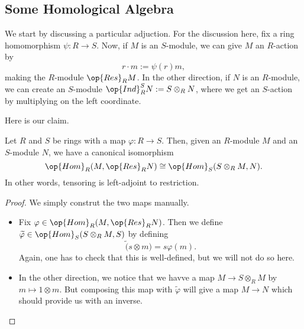 \subsection{Some Homological Algebra}
We start by discussing a particular adjuction. For the discussion here, fix a ring homomorphism $\psi:R\to S$. Now, if $M$ is an $S$-module, we can give $M$ an $R$-action by
\[r\cdot m:=\psi(r)m,\]
making the $R$-module $\op{Res}_RM$. In the other direction, if $N$ is an $R$-module, we can create an $S$-module $\op{Ind}_R^SN:=S\otimes_RN$, where we get an $S$-action by multiplying on the left coordinate.

Here is our claim.
\begin{proposition}
	Let $R$ and $S$ be rings with a map $\varphi:R\to S$. Then, given an $R$-module $M$ and an $S$-module $N$, we have a canonical isomorphism
	\[\op{Hom}_R(M,\op{Res}_RN)\cong\op{Hom}_S(S\otimes_RM,N).\]
	In other words, tensoring is left-adjoint to restriction.
\end{proposition}
\begin{proof}
	We simply construt the two maps manually.
	\begin{itemize}
		\item Fix $\varphi\in\op{Hom}_R(M,\op{Res}_RN)$. Then we define $\widetilde\varphi\in\op{Hom}_S(S\otimes_RM,S)$ by defining
		\[\widetilde(s\otimes m)=s\varphi(m).\]
		Again, one has to check that this is well-defined, but we will not do so here.

		\item In the other direction, we notice that we havve a map $M\to S\otimes_RM$ by $m\mapsto 1\otimes m$. But composing this map with $\widetilde\varphi$ will give a map $M\to N$ which should provide us with an inverse.
		\qedhere
	\end{itemize}
\end{proof}


